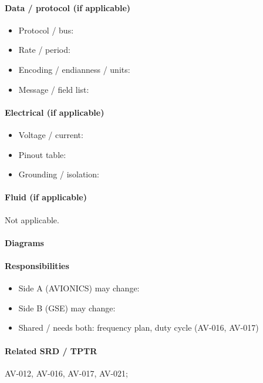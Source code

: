 \paragraph{Data / protocol (if applicable)}
\begin{itemize}
  \item Protocol / bus: \todo{}
  \item Rate / period: \todo{}
  \item Encoding / endianness / units: \todo{}
  \item Message / field list: 
\end{itemize}

\paragraph{Electrical (if applicable)}
\begin{itemize}
  \item Voltage / current: \todo{}
  \item Pinout table: \todo{}
  \item Grounding / isolation: \todo{}
\end{itemize}

\paragraph{Fluid (if applicable)}
Not applicable.

\paragraph{Diagrams}

\paragraph{Responsibilities}
\begin{itemize}
  \item Side A (AVIONICS) may change: 
  \item Side B (GSE) may change: 
  \item Shared / needs both: frequency plan, duty cycle (AV-016, AV-017)
\end{itemize}

\paragraph{Related SRD / TPTR}
AV-012, AV-016, AV-017, AV-021; 


